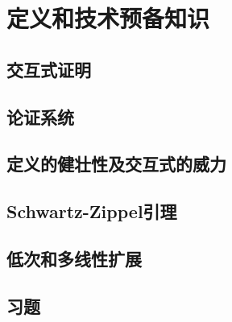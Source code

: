 \chapter{定义和技术预备知识}\label{chp:03Definition}
\section{交互式证明}\label{3.1}
\section{论证系统}\label{3.2}
\section{定义的健壮性及交互式的威力} \label{3.3}
\section{Schwartz-Zippel引理}\label{3.4}
\section{低次和多线性扩展}\label{3.5}
\section{习题}\label{3.6}
